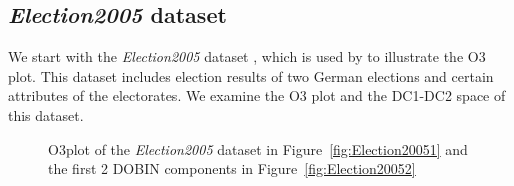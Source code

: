 \documentclass[a4paper,11pt]{article}
\begin{document}
\subsection{\textit{Election2005} dataset}\label{sec:ResWithVis1}
We start with the \textit{Election2005} dataset \citep{mbgraphic}, which is used by \cite{unwin2019multivariate}  to illustrate the O3 plot. This dataset includes election results of two German elections and certain attributes of the electorates. We examine the O3 plot and the DC1-DC2 space of this dataset.

\begin{figure}[!ht]
	\centering
	\caption{O3plot of the \textit{Election2005} dataset in Figure~\ref{fig:Election20051} and the first 2 DOBIN components in Figure~\ref{fig:Election20052} }
	\label{fig:Election2005}
\end{figure}
\end{document}

